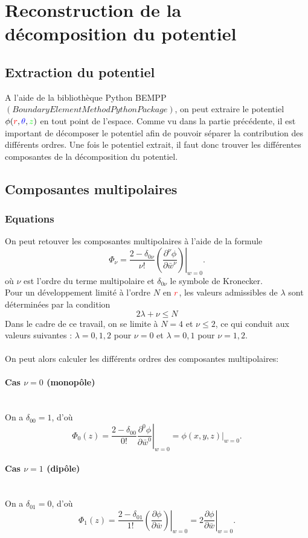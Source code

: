 \documentclass{article}
\begin{document}
\section{Reconstruction de la décomposition du potentiel}
\subsection{Extraction du potentiel}
A l'aide de la bibliothèque Python BEMPP $(Boundary Element Method Python Package)$, on peut extraire le potentiel $\phi ({\color{red}r},{\color{blue}\theta},{\color{green}z})$ 
en tout point de l'espace. Comme vu dans la partie précédente, il est important de décomposer le potentiel afin de pouvoir séparer la contribution des différents ordres. Une fois le potentiel extrait,
il faut donc trouver les différentes composantes de la décomposition du potentiel.

\subsection{Composantes multipolaires}
\subsubsection{Equations}
On peut retouver les composantes multipolaires à l'aide de la formule 
\[
\Phi_{\nu}= \frac{2-\delta_{0\nu}}{\nu!}\left.
(\frac{\partial^{\nu} \phi}{\partial \bar w^{\nu}})
\right|_{ w=0}.
\]
où $\nu$ est l'ordre du terme multipolaire et $\delta_{0\nu}$ le symbole de Kronecker.
\\
Pour un développement limité à l'ordre $N$ en ${\color{red}r}$, les valeurs admissibles de $\lambda$ sont déterminées par la condition
\[
2\lambda + \nu \le N
\]
Dans le cadre de ce travail, on se limite à $N=4$ et $\nu \le 2$, ce qui conduit aux valeurs suivantes : $\lambda = 0,1,2$ pour $\nu=0$ et $\lambda = 0,1$ pour $\nu=1,2$.
\\
\\
On peut alors calculer les différents ordres des composantes multipolaires: 
\paragraph{Cas \(\nu = 0\) (monopôle)}
\
\\
On a \(\delta_{00} = 1\), d'où
\[
\Phi_0(z) = \frac{2 - \delta_{00}}{0!} \left. \frac{\partial^{0} \phi}{\partial \bar{w}^{0}} \right|_{w=0} = \phi(x, y, z)\big|_{w=0}.
\]

\paragraph{Cas \(\nu = 1\) (dipôle)}
\
\\
On a \(\delta_{01} = 0\), d'où
\[
\Phi_1(z) = \frac{2 - \delta_{01}}{1!} \left. \left( \frac{\partial \phi}{\partial \bar{w}} \right) \right|_{w=0} = 2 \left. \frac{\partial \phi}{\partial \bar{w}} \right|_{w=0}.
\]
\end{document}
